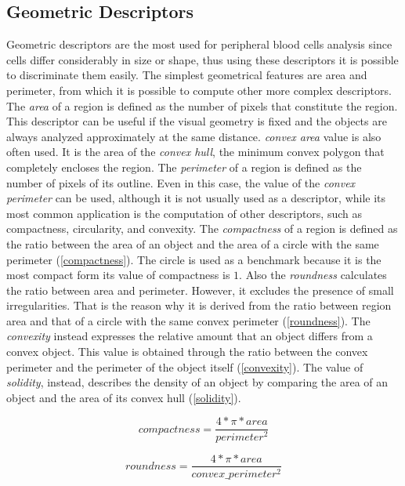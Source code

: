 \subsection{Geometric Descriptors} %
Geometric descriptors are the most used for peripheral blood cells analysis since cells differ considerably in size or shape, thus using these descriptors it is possible to discriminate them easily. The simplest geometrical features are area and perimeter, from which it is possible to compute other more complex descriptors. The \textit{area} of a region is defined as the number of pixels that constitute the region. This descriptor can be useful if the visual geometry is fixed and the objects are always analyzed approximately at the same distance. \textit{convex area} value is also often used. It is the area of the \textit{convex hull}, the minimum convex polygon that completely encloses the region.
The \textit{perimeter} of a region is defined as the number of pixels of its outline. Even in this case, the value of the \textit{convex perimeter} can be used, although it is not usually used as a descriptor, while its most common application is the computation of other descriptors, such as compactness, circularity, and convexity. The \textit{compactness} of a region is defined as the ratio between the area of an object and the area of a circle with the same perimeter (\ref{compactness}). The circle is used as a benchmark because it is the most compact form its value of compactness is $1$. Also the \textit{roundness} calculates the ratio between area and perimeter. However, it excludes the presence of small irregularities. That is the reason why it is derived from the ratio between region area and that of a circle with the same convex perimeter (\ref{roundness}). The \textit{convexity} instead expresses the relative amount that an object differs from a convex object. This value is obtained through the ratio between the convex perimeter and the perimeter of the object itself (\ref{convexity}). The value of \textit{solidity}, instead, describes the density of an object by comparing the area of an object and the area of its convex hull (\ref{solidity}).

\begin{equation}\label{compactness}
compactness=\frac{4*\pi*area}{perimeter^2}
\end{equation}

\begin{equation}\label{roundness}
roundness=\frac{4*\pi*area}{convex\_perimeter^2}
\end{equation}


